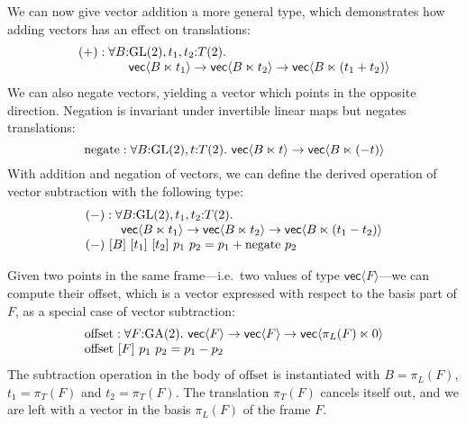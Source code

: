 We can now give vector addition a more general type, which
demonstrates how adding vectors has an effect on translations:
\begin{displaymath}
  \begin{array}{l}
    (+) : \forall B \mathord: \mathrm{GL}(2), t_1, t_2 \mathord: T(2).\ \\
    \quad\quad\quad\quad\mathsf{vec}\langle B \ltimes t_1\rangle \to \mathsf{vec}\langle B \ltimes t_2 \rangle \to \mathsf{vec}\langle B \ltimes (t_1 + t_2)\rangle
\end{array}
\end{displaymath}
We can also negate vectors, yielding a vector which points in the
opposite direction. Negation is invariant under invertible linear maps
but negates translations:
\begin{displaymath}
  \mathrm{negate} : \forall B \mathord: \mathrm{GL}(2), t \mathord: T(2).\ \mathsf{vec}\langle B \ltimes t\rangle \to \mathsf{vec}\langle B\ltimes(-t)\rangle
\end{displaymath}
With addition and negation of vectors, we can define the derived
operation of vector subtraction with the following type:
\begin{displaymath}
  \begin{array}{l}
    (-) : \forall B \mathord:\mathrm{GL}(2), t_1,t_2 \mathord:T(2).\ \\
    \hspace{1cm}\mathsf{vec}\langle B \ltimes t_1\rangle \to \mathsf{vec}\langle B \ltimes t_2\rangle \to \mathsf{vec}\langle B \ltimes (t_1 - t_2)\rangle \\
    (-)\ [B]\ [t_1]\ [t_2]\ p_1\ p_2 = p_1 + \mathrm{negate}\ p_2
\end{array}
\end{displaymath}

Given two points in the same frame---i.e.~two values of type
$\mathsf{vec}\langle F \rangle$---we can compute their offset, which
is a vector expressed with respect to the basis part of $F$, as a
special case of vector subtraction:
\begin{displaymath}
  \begin{array}{l}
    \mathrm{offset} : \forall F \mathord:\mathrm{GA}(2).\ \mathsf{vec}\langle F \rangle \to \mathsf{vec}\langle F \rangle \to \mathsf{vec}\langle \pi_L(F) \ltimes 0 \rangle \\
    \mathrm{offset}\ [F]\ p_1\ p_2 = p_1 - p_2
  \end{array}
\end{displaymath}
The subtraction operation in the body of $\mathrm{offset}$ is
instantiated with $B = \pi_L(F)$, $t_1 = \pi_T(F)$ and $t_2 =
\pi_T(F)$. The translation $\pi_T(F)$ cancels itself out, and we are
left with a vector in the basis $\pi_L(F)$ of the frame $F$.

